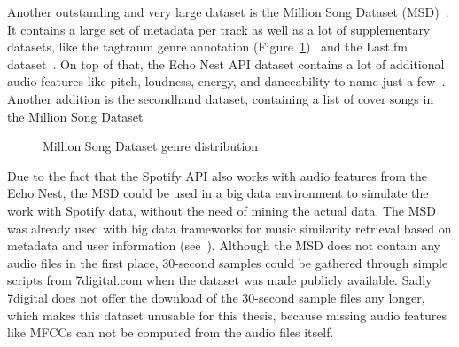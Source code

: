 Another outstanding and very large dataset is the Million Song Dataset (MSD)~\cite{msd1}. 
It contains a large set of metadata per track as well as a lot of supplementary datasets, like the tagtraum genre annotation (Figure~\ref{msddist})~\cite{msd5} and the Last.fm dataset~\cite{msd2}. On top of that, the Echo Nest API dataset contains a lot of additional audio features like pitch, loudness, energy, and danceability to name just a few~\cite{msd3}. 
Another addition is the secondhand dataset, containing a list of cover songs in the Million Song Dataset\cite{msd6}
\begin{figure}[thpb]
	\centering
	\caption{Million Song Dataset genre distribution \cite[p. 6]{msd5}}
	\label{msddist}
\end{figure}
\FloatBarrier
\noindent Due to the fact that the Spotify API\cite{spotifyapi1} also works with audio features from the Echo Nest\cite{echonest1}, the MSD could be used in a big data environment to simulate the work with Spotify data, without the need of mining the actual data. The MSD was already used with big data frameworks for music similarity retrieval based on metadata and user information (see~\cite{msd4}). Although the MSD does not contain any audio files in the first place, 30-second samples could be gathered through simple scripts from 7digital.com when the dataset was made publicly available. Sadly 7digital does not offer the download of the 30-second sample files any longer, which makes this dataset unusable for this thesis, because missing audio features like MFCCs can not be computed from the audio files itself. 
